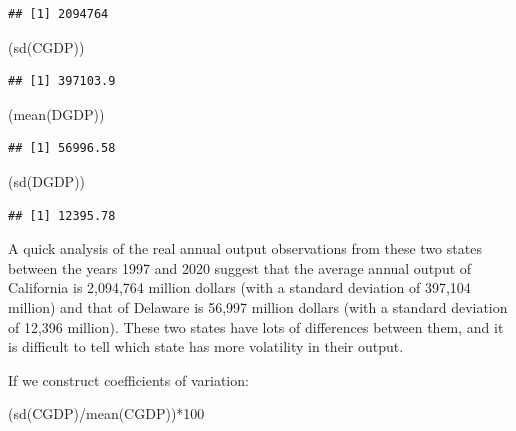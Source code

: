 \documentclass[
]{book}
\newenvironment{Shaded}{\begin{snugshade}}{\end{snugshade}}
\newcommand{\DecValTok}[1]{\textcolor[rgb]{0.00,0.00,0.81}{#1}}
\newcommand{\FunctionTok}[1]{\textcolor[rgb]{0.00,0.00,0.00}{#1}}
\newcommand{\NormalTok}[1]{#1}
\newcommand{\SpecialCharTok}[1]{\textcolor[rgb]{0.00,0.00,0.00}{#1}}
\begin{document}
\begin{verbatim}
## [1] 2094764
\end{verbatim}

\begin{Shaded}
\begin{Highlighting}[]
\NormalTok{(}\FunctionTok{sd}\NormalTok{(CGDP))}
\end{Highlighting}
\end{Shaded}

\begin{verbatim}
## [1] 397103.9
\end{verbatim}

\begin{Shaded}
\begin{Highlighting}[]
\NormalTok{(}\FunctionTok{mean}\NormalTok{(DGDP))}
\end{Highlighting}
\end{Shaded}

\begin{verbatim}
## [1] 56996.58
\end{verbatim}

\begin{Shaded}
\begin{Highlighting}[]
\NormalTok{(}\FunctionTok{sd}\NormalTok{(DGDP))}
\end{Highlighting}
\end{Shaded}

\begin{verbatim}
## [1] 12395.78
\end{verbatim}

A quick analysis of the real annual output observations from these two states between the years 1997 and 2020 suggest that the average annual output of California is 2,094,764 million dollars (with a standard deviation of 397,104 million) and that of Delaware is 56,997 million dollars (with a standard deviation of 12,396 million). These two states have lots of differences between them, and it is difficult to tell which state has more volatility in their output.

If we construct coefficients of variation:

\begin{Shaded}
\begin{Highlighting}[]
\NormalTok{(}\FunctionTok{sd}\NormalTok{(CGDP)}\SpecialCharTok{/}\FunctionTok{mean}\NormalTok{(CGDP))}\SpecialCharTok{*}\DecValTok{100}
\end{Highlighting}
\end{Shaded}
\end{document}
